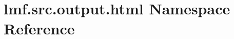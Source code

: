 \hypertarget{namespacelmf_1_1src_1_1output_1_1html}{\section{lmf.\+src.\+output.\+html Namespace Reference}
\label{namespacelmf_1_1src_1_1output_1_1html}
}
